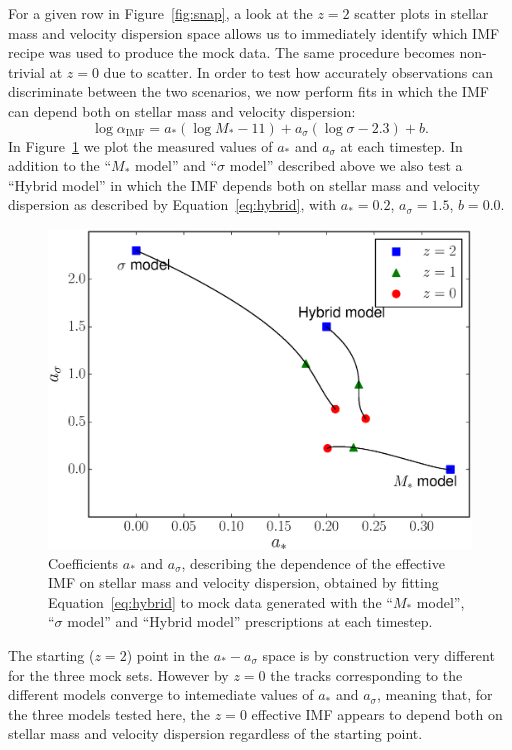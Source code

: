 \documentclass[usenatbib, letters]{mnras}
\def\aimf{\alpha_{\mathrm{IMF}}}
\def\Fref#1{Figure~\ref{#1}\xspace}
\def\Eref#1{Equation~\ref{#1}\xspace}
\begin{document}
For a given row in \Fref{fig:snap}, a look at the $z=2$ scatter plots in stellar mass and velocity dispersion space allows us to immediately identify which IMF recipe was used to produce the mock data.
The same procedure becomes non-trivial at $z=0$ due to scatter.
In order to test how accurately observations can discriminate between the two scenarios, we now perform fits in which the IMF can depend both on stellar mass and velocity dispersion:
\begin{equation}\label{eq:hybrid}
\log{\aimf} = a_*(\log{M_*} - 11) + a_\sigma(\log{\sigma} - 2.3) + b.
\end{equation}
In \Fref{fig:tracks} we plot the measured values of $a_*$ and $a_\sigma$ at each timestep.
In addition to the ``$M_*$ model'' and ``$\sigma$ model'' described above we also test a ``Hybrid model'' in which the IMF depends both on stellar mass and velocity dispersion as described by \Eref{eq:hybrid}, 
with $a_*=0.2$, $a_\sigma=1.5$, $b=0.0$.
%
\begin{figure}
 \includegraphics[width=\columnwidth]{tracks.eps}
 \caption{ 
Coefficients $a_*$ and $a_\sigma$, describing the dependence of the effective IMF on stellar mass and velocity dispersion, obtained by fitting \Eref{eq:hybrid} to mock data generated with the ``$M_*$ model'', ``$\sigma$ model'' and ``Hybrid model'' prescriptions at each timestep.
}
 \label{fig:tracks}
\end{figure}
%
The starting ($z=2$) point in the $a_*-a_\sigma$ space is by construction very different for the three mock sets. However by $z=0$ the tracks corresponding to the different models converge to intemediate values of $a_*$ and $a_\sigma$, meaning that, for the three models tested here, the $z=0$ effective IMF appears to depend both on stellar mass and velocity dispersion regardless of the starting point.
\end{document}
